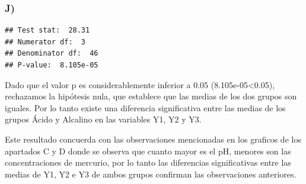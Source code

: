 \documentclass[
]{article}
\begin{document}
\hypertarget{j}{%
\subsubsection{J)}\label{j}}

\begin{verbatim}
## Test stat:  28.31 
## Numerator df:  3 
## Denominator df:  46 
## P-value:  8.105e-05
\end{verbatim}

Dado que el valor p es considerablemente inferior a 0.05
(8.105e-05\textless0.05), rechazamos la hipótesis nula, que establece
que las medias de los dos grupos son iguales. Por lo tanto existe una
diferencia significativa entre las medias de los grupos Ácido y Alcalino
en las variables Y1, Y2 y Y3.

Este resultado concuerda con las observaciones mencionadas en los
graficos de los apartados C y D donde se observa que cuanto mayor es el
pH, menores son las concentraciones de mercurio, por lo tanto las
diferencias significativas entre las medias de Y1, Y2 e Y3 de ambos
grupos confirman las observaciones anteriores.
\end{document}
